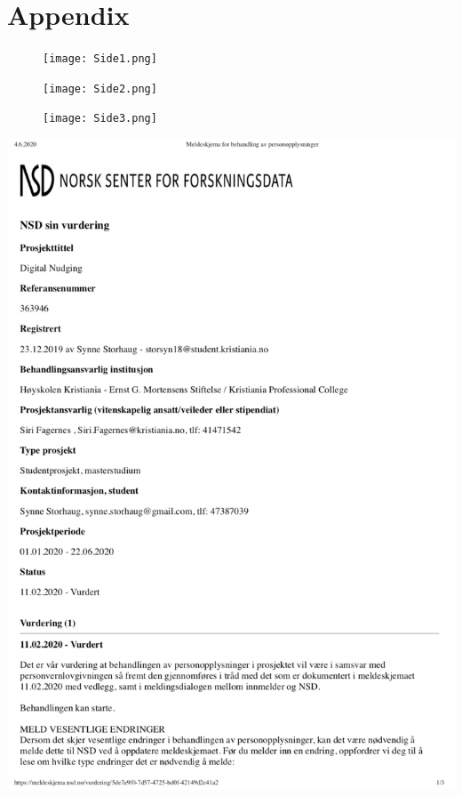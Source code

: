 \chapter{Appendix}


\begin{figure}
\texttt{[image: Side1.png]}
\end{figure}

\begin{figure}
    \centering
    \texttt{[image: Side2.png]}
\end{figure}

\begin{figure}
    \centering
    \texttt{[image: Side3.png]}
\end{figure}

    \centering
    \includegraphics[width=1\textwidth]{images/MS1.png}

